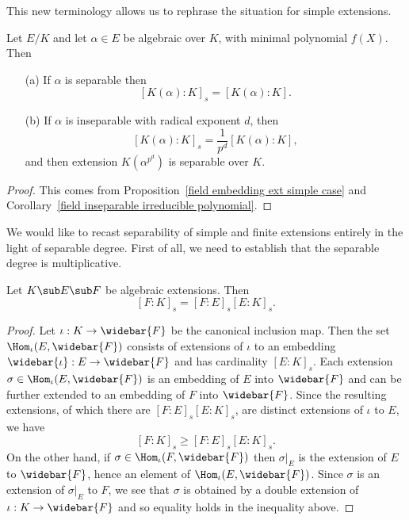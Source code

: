 This new terminology allows us to rephrase the situation for simple extensions.
\begin{theorem}\label{field simple ext separable degree}
Let $E/K$ and let $\alpha\in E$ be algebraic over $K$, with minimal polynomial $f(X)$. Then
\begin{itemize}
\item[(a)] If $\alpha$ is separable then 
\[[K(\alpha):K]_s=[K(\alpha):K].\] 
\item[(b)] If $\alpha$ is inseparable with radical exponent $d$, then
\[[K(\alpha):K]_s=\frac{1}{p^d}[K(\alpha):K],\]
and then extension $K(\alpha^{p^d})$ is separable over $K$.
\end{itemize}
\end{theorem}
\begin{proof}
This comes from Proposition~\ref{field embedding ext simple case} and Corollary~\ref{field inseparable irreducible polynomial}.
\end{proof}
We would like to recast separability of simple and finite extensions entirely in the light of separable degree. First of all, we need to establish that the separable degree is multiplicative.
\begin{theorem}\label{field ext separable degree multiplicative}
Let $K\sub E\sub F$ be algebraic extensions. Then 
\[[F:K]_s=[F:E]_s[E:K]_s.\]
\end{theorem}
\begin{proof}
Let $\iota:K\to\widebar{F}$ be the canonical inclusion map. Then the set $\Hom_{\iota}(E,\widebar{F})$ consists of extensions of $\iota$ to an embedding $\widebar{\iota}:E\to\widebar{F}$ and has cardinality $[E:K]_s$. Each extension $\sigma\in\Hom_{\iota}(E,\widebar{F})$ is an embedding of $E$ into $\widebar{F}$ and can be further extended to an embedding of $F$ into $\widebar{F}$. Since the resulting extensions, of which there are $[F:E]_s[E:K]_s$, are distinct extensions of $\iota$ to $E$, we have
\[[F:K]_s\geq[F:E]_s[E:K]_s.\]
On the other hand, if $\sigma\in\Hom_{\iota}(F,\widebar{F})$ then $\sigma|_E$ is the extension of $E$ to $\widebar{F}$, hence an element of $\Hom_{\iota}(E,\widebar{F})$. Since $\sigma$ is an extension of $\sigma|_E$ to $F$, we see that $\sigma$ is obtained by a double extension of $\iota:K\to\widebar{F}$ and so equality holds in the inequality above.
\end{proof}
